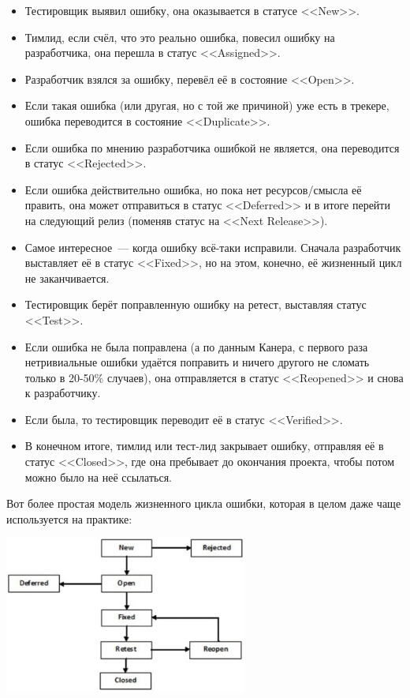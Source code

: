 \documentclass{../../text-style}
\begin{document}
\begin{itemize}
    \item Тестировщик выявил ошибку, она оказывается в статусе <<New>>.
    \item Тимлид, если счёл, что это реально ошибка, повесил ошибку на разработчика, она перешла в статус <<Assigned>>.
    \item Разработчик взялся за ошибку, перевёл её в состояние <<Open>>.
    \item Если такая ошибка (или другая, но с той же причиной) уже есть в трекере, ошибка переводится в состояние <<Duplicate>>.
    \item Если ошибка по мнению разработчика ошибкой не является, она переводится в статус <<Rejected>>.
    \item Если ошибка действительно ошибка, но пока нет ресурсов/смысла её править, она может отправиться в статус <<Deferred>> и в итоге перейти на следующий релиз (поменяв статус на <<Next Release>>).
    \item Самое интересное~--- когда ошибку всё-таки исправили. Сначала разработчик выставляет её в статус <<Fixed>>, но на этом, конечно, её жизненный цикл не заканчивается.
    \item Тестировщик берёт поправленную ошибку на ретест, выставляя статус <<Test>>.
    \item Если ошибка не была поправлена (а по данным Канера, с первого раза нетривиальные ошибки удаётся поправить и ничего другого не сломать только в 20-50\% случаев), она отправляется в статус <<Reopened>> и снова к разработчику.
    \item Если была, то тестировщик переводит её в статус <<Verified>>.
    \item В конечном итоге, тимлид или тест-лид закрывает ошибку, отправляя её в статус <<Closed>>, где она пребывает до окончания проекта, чтобы потом можно было на неё ссылаться.
\end{itemize}

Вот более простая модель жизненного цикла ошибки, которая в целом даже чаще используется на практике:

\begin{center}
    \includegraphics[width=0.6\textwidth]{bugLifecycle2.png}
\end{center}
\end{document}
